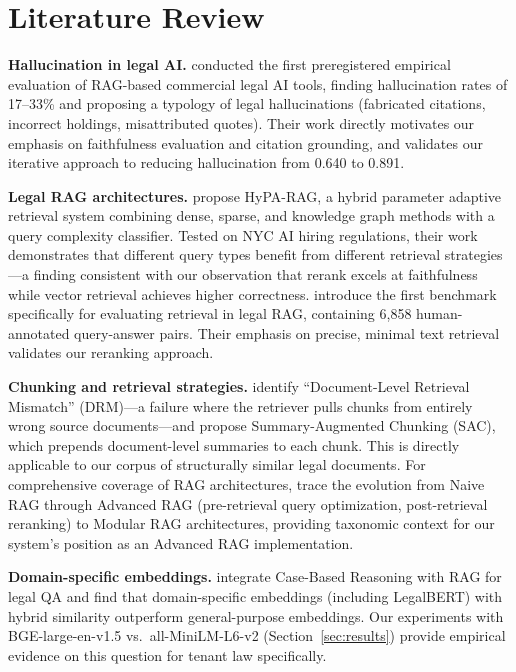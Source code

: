 \documentclass{article}
\begin{document}
\section{Literature Review}
\label{sec:lit_review}

\textbf{Hallucination in legal AI.} \citet{magesh2025hallucination} conducted the first preregistered empirical evaluation of RAG-based commercial legal AI tools, finding hallucination rates of 17--33\% and proposing a typology of legal hallucinations (fabricated citations, incorrect holdings, misattributed quotes). Their work directly motivates our emphasis on faithfulness evaluation and citation grounding, and validates our iterative approach to reducing hallucination from 0.640 to 0.891.

\textbf{Legal RAG architectures.} \citet{kalra2024hyparag} propose HyPA-RAG, a hybrid parameter adaptive retrieval system combining dense, sparse, and knowledge graph methods with a query complexity classifier. Tested on NYC AI hiring regulations, their work demonstrates that different query types benefit from different retrieval strategies---a finding consistent with our observation that rerank excels at faithfulness while vector retrieval achieves higher correctness. \citet{legalbenchrag2024} introduce the first benchmark specifically for evaluating retrieval in legal RAG, containing 6,858 human-annotated query-answer pairs. Their emphasis on precise, minimal text retrieval validates our reranking approach.

\textbf{Chunking and retrieval strategies.} \citet{nllp2025reliable} identify ``Document-Level Retrieval Mismatch'' (DRM)---a failure where the retriever pulls chunks from entirely wrong source documents---and propose Summary-Augmented Chunking (SAC), which prepends document-level summaries to each chunk. This is directly applicable to our corpus of structurally similar legal documents. For comprehensive coverage of RAG architectures, \citet{gao2024ragsurvey} trace the evolution from Naive RAG through Advanced RAG (pre-retrieval query optimization, post-retrieval reranking) to Modular RAG architectures, providing taxonomic context for our system's position as an Advanced RAG implementation.

\textbf{Domain-specific embeddings.} \citet{wiratunga2024cbrrag} integrate Case-Based Reasoning with RAG for legal QA and find that domain-specific embeddings (including LegalBERT) with hybrid similarity outperform general-purpose embeddings. Our experiments with BGE-large-en-v1.5 vs.\ all-MiniLM-L6-v2 (Section~\ref{sec:results}) provide empirical evidence on this question for tenant law specifically.
\end{document}
